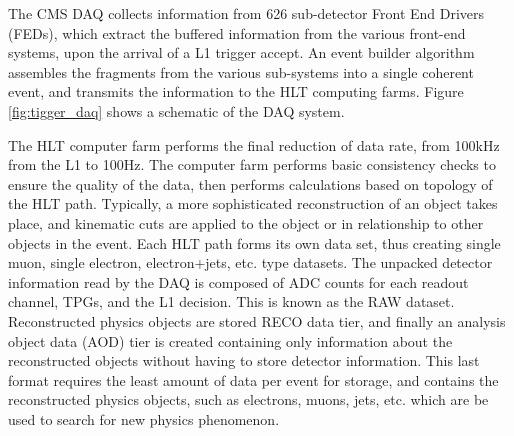 \par The CMS DAQ collects information from 626 sub-detector Front End
Drivers (FEDs), which extract the buffered information from the
various front-end systems, upon the arrival of a L1 trigger accept.
An event builder algorithm assembles the fragments from the various
sub-systems into a single coherent event, and transmits the
information to the HLT computing farms.  Figure \ref{fig:tigger_daq}
shows a schematic of the DAQ system.  

\par  The HLT computer farm performs the final reduction of data rate,
from 100kHz from the L1 to 100Hz.  The computer farm performs basic
consistency checks to ensure the quality of the data, then performs
calculations based on topology of the HLT path.  Typically, a more
sophisticated reconstruction of an object takes place, and kinematic
cuts are applied to the object or in relationship to other objects in
the event.  Each HLT path forms its own data set, thus creating single
muon, single electron, electron+jets, etc. type datasets.  The unpacked
detector information read by the DAQ is composed of ADC counts for
each readout channel, TPGs, and the L1 decision.  This is known as the
RAW dataset.  Reconstructed physics objects are stored RECO data tier,
and finally an analysis object data (AOD) tier is created containing
only information about the reconstructed objects without having to
store detector information.  This last format requires the least
amount of data per event for storage, and contains the reconstructed
physics objects, such as electrons, muons, jets, etc. which are be
used to search for new physics phenomenon.  